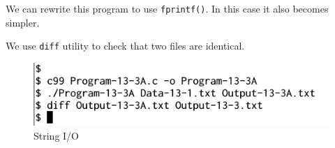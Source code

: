 \documentclass[11pt,a4paper]{article}
\begin{document}
We can rewrite this program to use \texttt{fprintf()}. In this case it also becomes simpler.



We use \texttt{diff} utility to check that two files are identical.
\begin{figure}[ht]
\begin{center}
\includegraphics[scale=0.6]{Output-13-3A.png}
\caption{String I/O}
\label{output-13-3A}
\end{center}
\end{figure}
\end{document}
